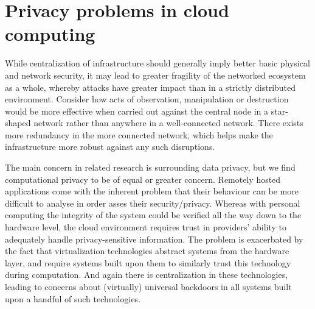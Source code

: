 \documentclass[11pt]{article}
\begin{document}
\section{Privacy problems in cloud computing}
\label{sec:problems_in_cloud_computing}

While centralization of infrastructure should generally imply better basic physical and network security, it may lead to greater fragility of the networked ecosystem as a whole, whereby attacks have greater impact than in a strictly distributed environment.
Consider how acts of observation, manipulation or destruction would be more effective when carried out against the central node in a star-shaped network rather than anywhere in a well-connected network.
There exists more redundancy in the more connected network, which helps make the infrastructure more robust against any such disruptions.

The main concern in related research is surrounding data privacy, but we find computational privacy to be of equal or greater concern.
Remotely hosted applications come with the inherent problem that their behaviour can be more difficult to analyse in order asses their security/privacy.
Whereas with personal computing the integrity of the system could be verified all the way down to the hardware level, the cloud environment requires trust in providers' ability to adequately handle privacy-sensitive information.
The problem is exacerbated by the fact that virtualization technologies abstract systems from the hardware layer, and require systems built upon them to similarly trust this technology during computation.
And again there is centralization in these technologies, leading to concerns about (virtually) universal backdoors in all systems built upon a handful of such technologies.
\cite{chow2009controlling}


\end{document}
